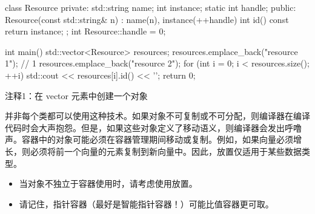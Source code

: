 
\begin{cpp}
class Resource {
private:
  std::string name;
  int instance;
  static int handle;
public:
  Resource(const std::string& n) : name(n), instance(++handle) {}
  int id() const { return instance; }
};
int Resource::handle = 0;

int main() {
  std::vector<Resource> resources;
  resources.emplace_back("resource 1"); // 1
  resources.emplace_back("resource 2");
  for (int i = 0; i < resources.size(); ++i)
    std::cout << resources[i].id() << '\n';
  return 0;
}
\end{cpp}

{\footnotesize
注释1：在 vector 元素中创建一个对象
}

并非每个类都可以使用这种技术。如果对象不可复制或不可分配，则编译器在编译代码时会大声抱怨。但是，如果这些对象定义了移动语义，则编译器会发出呼噜声。容器中的对象可能必须在容器管理期间移动或复制。例如，如果向量必须增长，则必须将前一个向量的元素复制到新向量中。因此，放置仅适用于某些数据类型。


\begin{itemize}
\item
当对象不独立于容器使用时，请考虑使用放置。

\item
请记住，指针容器（最好是智能指针容器！）可能比值容器更可取。
\end{itemize}













